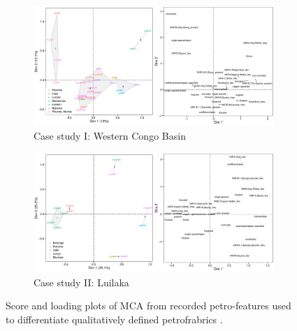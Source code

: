 \documentclass[a4paper]{article}
\begin{document}
\begin{figure}[H]
	\begin{subfigure}[t]{\textwidth}
		\includegraphics[width=\textwidth]{Fig_Petrofarbics_wCB.pdf}
		\caption{Case study I: Western Congo Basin}
		\label{fig:petrofrabrics.wCB}
	\end{subfigure}
	\begin{subfigure}[t]{\textwidth}
		\includegraphics[width=\textwidth]{Fig_Petrofarbics_luilaka.pdf}
		\caption{Case study II: Luilaka}
		\label{fig:petrofrabrics.luilaka}
	\end{subfigure}
	\caption{Score and loading plots of MCA from recorded petro-features used to differentiate qualitatively defined petrofrabrics \citep[cf.][]{Cau.2004}.}
	\label{fig:petrofrabrics}
\end{figure}
\end{document}
